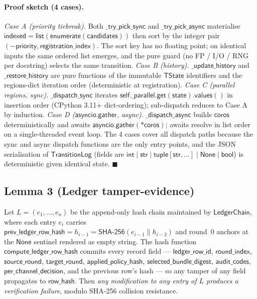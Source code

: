\documentclass[journal,twocolumn,final]{IEEEtran}
\begin{document}
\paragraph{Proof sketch (4 cases).}
\emph{Case A (priority tiebreak).} Both $\mathsf{\_try\_pick\_sync}$ and
$\mathsf{\_try\_pick\_async}$ materialise $\mathsf{indexed} =
\mathsf{list}(\mathsf{enumerate}(\mathsf{candidates}))$ then sort by the
integer pair $(-\mathsf{priority}, \mathsf{registration\_index})$. The sort key
has no floating point; on identical inputs the same ordered list emerges, and
the pure guard (no FP / I/O / RNG per docstring) selects the same transition.
\emph{Case B (history).} $\mathsf{\_update\_history}$ and $\mathsf{\_restore\_history}$
are pure functions of the immutable $\mathsf{TState}$ identifiers and the
regions-dict iteration order (deterministic at registration). \emph{Case C
(parallel regions, sync).} $\mathsf{\_dispatch\_sync}$ iterates
$\mathsf{self.\_parallel.get}(\mathsf{state}).\mathsf{values()}$ in insertion
order (CPython 3.11+ dict-ordering); sub-dispatch reduces to Case A by
induction. \emph{Case D ($\mathsf{asyncio.gather}$, async).}
$\mathsf{\_dispatch\_async}$ builds $\mathsf{coros}$ deterministically and
awaits $\mathsf{asyncio.gather}(*\mathsf{coros})$; awaits resolve in list
order on a single-threaded event loop. The 4 cases cover all dispatch paths
because the sync and async dispatch functions are the only entry points, and
the JSON serialisation of $\mathsf{TransitionLog}$ (fields are
$\mathsf{int \mid str \mid tuple[str, \ldots] \mid None \mid bool}$) is
deterministic given identical state. $\blacksquare$

\subsection{Lemma 3 (Ledger tamper-evidence)}

Let $L = (e_1, \dots, e_n)$ be the append-only hash chain maintained by
$\mathsf{LedgerChain}$, where each entry $e_i$ carries
$\mathsf{prev\_ledger\_row\_hash} = h_{i-1} = \mathsf{SHA\text{-}256}(e_{i-1}
\parallel h_{i-2})$ and round~0 anchors at the $\mathsf{None}$ sentinel
rendered as empty string. The hash function $\mathsf{compute\_ledger\_row\_hash}$
commits every record field --- $\mathsf{ledger\_row\_id}$, $\mathsf{round\_index}$,
$\mathsf{source\_round}$, $\mathsf{target\_round}$, $\mathsf{applied\_policy\_hash}$,
$\mathsf{selected\_bundle\_digest}$, $\mathsf{audit\_codes}$, $\mathsf{per\_channel\_decision}$,
and the previous row's hash --- so any tamper of any field propagates to
$\mathsf{row\_hash}$. Then \emph{any modification to any entry of $L$
produces a verification failure}, modulo SHA-256 collision resistance.
\end{document}
